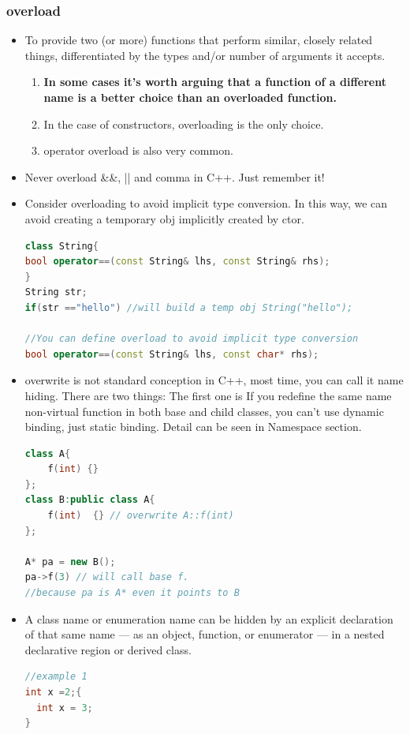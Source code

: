 \documentclass[a4paper,12pt,twoside]{book}
\begin{document}
\subsubsection{overload}
\begin{itemize}

\item To provide two (or more) functions that perform similar, closely related things, differentiated by the types and/or number of arguments it accepts.
\begin{enumerate}
\item \textbf{In some cases it's worth arguing that a function of a different name is a better choice than an overloaded function.}
\item  In the case of constructors, overloading is the only choice.
\item  operator overload is also very common.
\end{enumerate}

\item Never overload \&\&, || and comma in C++.  Just remember it!

\item Consider overloading to avoid implicit type conversion. In this way, we can avoid creating a temporary obj implicitly created by ctor.

\begin{lstlisting}[frame=single, language=c++]
class String{
bool operator==(const String& lhs, const String& rhs);
}
String str;
if(str =="hello") //will build a temp obj String("hello");

//You can define overload to avoid implicit type conversion
bool operator==(const String& lhs, const char* rhs);
\end{lstlisting}


\item overwrite is not standard conception in C++, most time, you can call it name hiding. There are two things: The first one is If you redefine the same name non-virtual function in both base and child classes, you can't use dynamic binding, just static binding.  Detail can be seen in Namespace section.
\begin{lstlisting}[frame=single, language=c++]
class A{
    f(int) {}
};
class B:public class A{
    f(int)  {} // overwrite A::f(int)
};

A* pa = new B();
pa->f(3) // will call base f.
//because pa is A* even it points to B
\end{lstlisting}

\item A class name or enumeration name can be hidden by an explicit declaration of that same name — as an object, function, or enumerator — in a nested declarative region or derived class.
\begin{lstlisting}[frame=single, language=c++]
//example 1
int x =2;{
  int x = 3;
}


\end{lstlisting}
\end{itemize}
\end{document}
